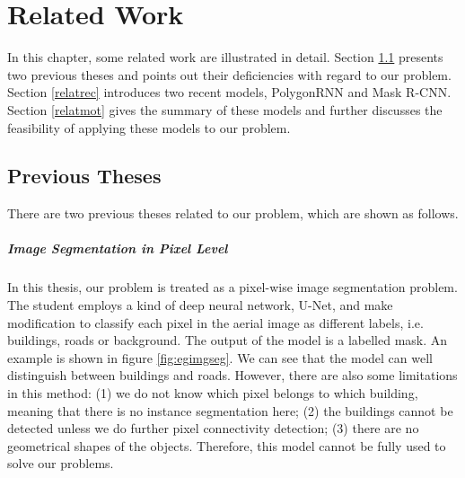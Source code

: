 \chapter{Related Work}

In this chapter, some related work are illustrated in detail. Section \ref{relatpre} presents two previous theses and points out their deficiencies with regard to our problem. Section \ref{relatrec} introduces two recent models, PolygonRNN and Mask R-CNN. Section \ref{relatmot} gives the summary of these models and further discusses the feasibility of applying these models to our problem.

\section{Previous Theses}\label{relatpre}

There are two previous theses related to our problem, which are shown as follows.

\paragraph{Image Segmentation in Pixel Level}
In this thesis, our problem is treated as a pixel-wise image segmentation problem. The student employs a kind of deep neural network, U-Net, and make modification to classify each pixel in the aerial image as different labels, i.e. buildings, roads or background. The output of the model is a labelled mask. An example is shown in figure \ref{fig:egimgseg}. We can see that the model can well distinguish between buildings and roads. However, there are also some limitations in this method: (1) we do not know which pixel belongs to which building, meaning that there is no instance segmentation here; (2) the buildings cannot be detected unless we do further pixel connectivity detection; (3) there are no geometrical shapes of the objects. Therefore, this model cannot be fully used to solve our problems.

